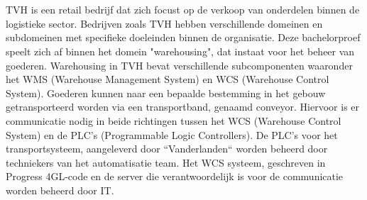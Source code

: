
\chapter{}%
\label{ch:inleiding}



\section{}%
\label{sec:context}
TVH is een retail bedrijf dat zich focust op de verkoop van onderdelen binnen de logistieke sector. 
Bedrijven zoals TVH hebben verschillende domeinen en subdomeinen met specifieke doeleinden binnen de organisatie. 
Deze bachelorproef speelt zich af binnen het domein "warehousing", dat instaat voor het beheer van goederen.
Warehousing in TVH bevat verschillende subcomponenten waaronder het WMS (Warehouse Management System) en WCS (Warehouse Control System).
Goederen kunnen naar een bepaalde bestemming in het gebouw getransporteerd worden via een transportband, genaamd conveyor.
Hiervoor is er communicatie nodig in beide richtingen tussen het WCS (Warehouse Control System) en de PLC's (Programmable Logic Controllers).
De PLC's voor het transportsysteem, aangeleverd door ``Vanderlanden`` worden beheerd door techniekers van het automatisatie team.
Het WCS systeem, geschreven in Progress 4GL-code en de server die verantwoordelijk is voor de communicatie worden beheerd door IT.
\newline
\newpage

